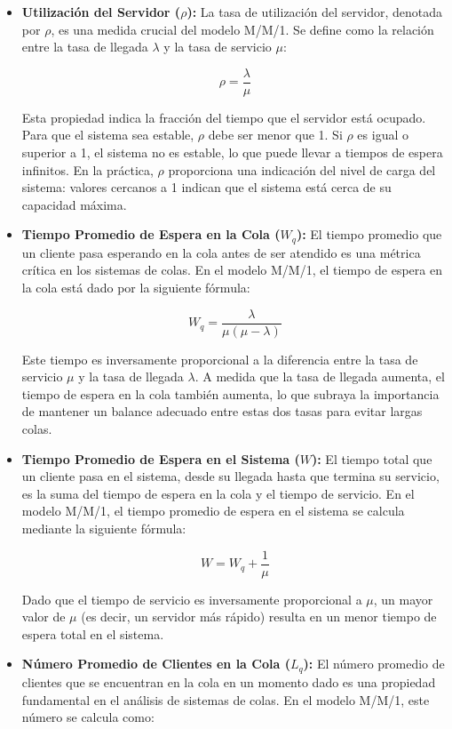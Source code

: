 \documentclass{article}
\begin{document}
\begin{itemize}
    \item \textbf{Utilización del Servidor (\(\rho\)):} 
    La tasa de utilización del servidor, denotada por \( \rho \), es una medida crucial del modelo M/M/1. Se define como la relación entre la tasa de llegada \( \lambda \) y la tasa de servicio \( \mu \):

    \[
    \rho = \frac{\lambda}{\mu}
    \]

    Esta propiedad indica la fracción del tiempo que el servidor está ocupado. Para que el sistema sea estable, \( \rho \) debe ser menor que 1. Si \( \rho \) es igual o superior a 1, el sistema no es estable, lo que puede llevar a tiempos de espera infinitos. En la práctica, \( \rho \) proporciona una indicación del nivel de carga del sistema: valores cercanos a 1 indican que el sistema está cerca de su capacidad máxima.

    \item \textbf{Tiempo Promedio de Espera en la Cola (\( W_q \)):} 
    El tiempo promedio que un cliente pasa esperando en la cola antes de ser atendido es una métrica crítica en los sistemas de colas. En el modelo M/M/1, el tiempo de espera en la cola está dado por la siguiente fórmula:

    \[
    W_q = \frac{\lambda}{\mu (\mu - \lambda)}
    \]

    Este tiempo es inversamente proporcional a la diferencia entre la tasa de servicio \( \mu \) y la tasa de llegada \( \lambda \). A medida que la tasa de llegada aumenta, el tiempo de espera en la cola también aumenta, lo que subraya la importancia de mantener un balance adecuado entre estas dos tasas para evitar largas colas.

    \item \textbf{Tiempo Promedio de Espera en el Sistema (\( W \)):} 
    El tiempo total que un cliente pasa en el sistema, desde su llegada hasta que termina su servicio, es la suma del tiempo de espera en la cola y el tiempo de servicio. En el modelo M/M/1, el tiempo promedio de espera en el sistema se calcula mediante la siguiente fórmula:

    \[
    W = W_q + \frac{1}{\mu}
    \]

    Dado que el tiempo de servicio es inversamente proporcional a \( \mu \), un mayor valor de \( \mu \) (es decir, un servidor más rápido) resulta en un menor tiempo de espera total en el sistema.

    \item \textbf{Número Promedio de Clientes en la Cola (\( L_q \)):} 
    El número promedio de clientes que se encuentran en la cola en un momento dado es una propiedad fundamental en el análisis de sistemas de colas. En el modelo M/M/1, este número se calcula como:


\end{itemize}
\end{document}

